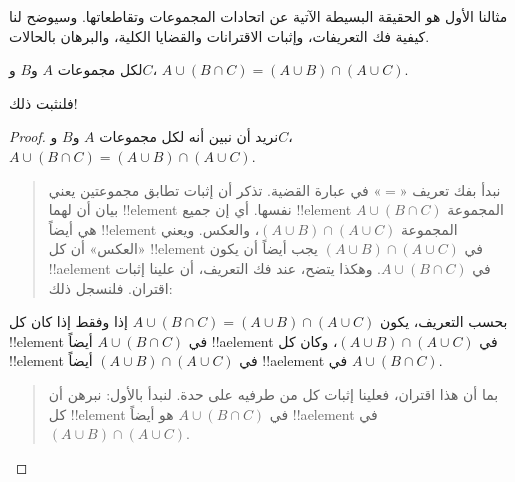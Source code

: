 \documentclass[../../../include/open-logic-section]{subfiles}
\begin{document}


مثالنا الأول هو الحقيقة البسيطة الآتية عن اتحادات المجموعات
وتقاطعاتها. وسيوضح لنا كيفية فك التعريفات، وإثبات الاقترانات والقضايا
الكلية، والبرهان بالحالات.

\begin{prop}
لكل مجموعات $A$ و$B$ و$C$،
$A \cup (B \cap C) = (A \cup B) \cap (A \cup C)$.
\end{prop}

فلنثبت ذلك!{}

\begin{proof}
نريد أن نبين أنه لكل مجموعات $A$ و$B$ و$C$،
$A \cup (B \cap C) = (A \cup B) \cap (A \cup C)$.
\begin{quote}
نبدأ بفك تعريف «$=$» في عبارة القضية. تذكر أن إثبات تطابق مجموعتين
يعني بيان أن لهما !!{element} نفسها. أي إن جميع !!{element} المجموعة
$A \cup (B \cap C)$ هي أيضاً !!{element} المجموعة
$(A \cup B) \cap (A \cup C)$، والعكس. ويعني «العكس» أن كل
!!{element} في $(A \cup B) \cap (A \cup C)$ يجب أيضاً أن يكون
!!a{element} في $A \cup (B \cap C)$. وهكذا يتضح، عند فك التعريف، أن
علينا إثبات اقتران. فلنسجل ذلك:
\end{quote}
بحسب التعريف، يكون
$A \cup (B \cap C) = (A \cup B) \cap (A \cup C)$ إذا وفقط إذا كان كل
!!{element} في $A \cup (B \cap C)$ أيضاً !!a{element} في
$(A \cup B) \cap (A \cup C)$، وكان كل !!{element} في
$(A \cup B) \cap (A \cup C)$ أيضاً !!a{element} في
$A \cup (B \cap C)$.
\begin{quote}
بما أن هذا اقتران، فعلينا إثبات كل من طرفيه على حدة. لنبدأ بالأول:
نبرهن أن كل !!{element} في $A \cup (B \cap C)$ هو أيضاً
!!a{element} في $(A \cup B) \cap (A \cup C)$.


\end{quote}
\end{proof}
\end{document}
